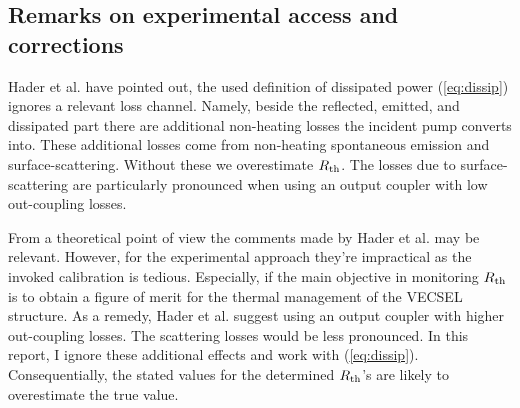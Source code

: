 \subsection{Remarks on experimental access and corrections}

Hader et al. \cite{Hader2013}
have pointed out,
the used definition of
dissipated power (\ref{eq:dissip})
ignores a relevant loss channel.
Namely,
beside the reflected,
emitted,
and dissipated part
there are additional non-heating losses
the incident pump converts into.
These additional losses come from
non-heating spontaneous emission
and surface-scattering.
Without these
we overestimate $R_\mathrm{th}$.
The losses due to surface-scattering
are particularly pronounced
when using an output coupler
with low out-coupling losses.

From a theoretical point of view
the comments made by
Hader et al. \cite{Hader2013}
may be relevant.
However, for the experimental approach
they're impractical
as the invoked calibration
is tedious.
Especially,
if the main objective in monitoring $R_\mathrm{th}$
is to obtain a figure of merit
for the thermal management
of the VECSEL structure.
As a remedy,
Hader et al. suggest
using an output coupler
with higher out-coupling losses.
The scattering losses
would be less pronounced.
In this report,
I ignore these additional effects
and work with (\ref{eq:dissip}).
Consequentially,
the stated values for the determined $R_\mathrm{th}$'s
are likely to overestimate
the true value.